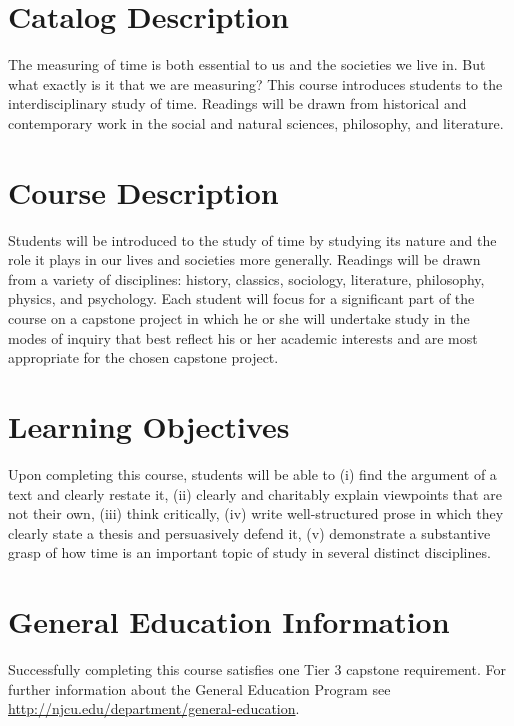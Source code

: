 \documentclass[article,oneside]{memoir}
\begin{document}
\section{Catalog Description}
The measuring of time is both essential to us and the societies we live in. But what exactly is it that we are measuring? This course introduces students to the interdisciplinary study of time. Readings will be drawn from historical and contemporary work in the social and natural sciences, philosophy, and literature.

\section{Course Description}
Students will be introduced to the study of time by studying its nature and the role it plays in our lives and societies more generally. Readings will be drawn from a variety of disciplines: history, classics, sociology, literature, philosophy, physics, and psychology. Each student will focus for a significant part of the course on a capstone project in which he or she will undertake study in the modes of inquiry that best reflect his or her academic interests and are most appropriate for the chosen capstone project. 





\section{Learning Objectives}

Upon completing this course, students will be able to (i) find the argument of a text and clearly restate it, (ii) clearly and charitably explain viewpoints that are not their own, (iii) think critically, (iv) write well-structured prose in which they clearly state a thesis and persuasively defend it, (v) demonstrate a substantive grasp of how time is an  important topic of study in several distinct disciplines. 

\section{General Education Information} 
Successfully completing this course satisfies one Tier 3 capstone requirement. For further information about the General Education Program see \href{http://njcu.edu/department/general-education}{http://njcu.edu/department/general-education}.
\end{document}
